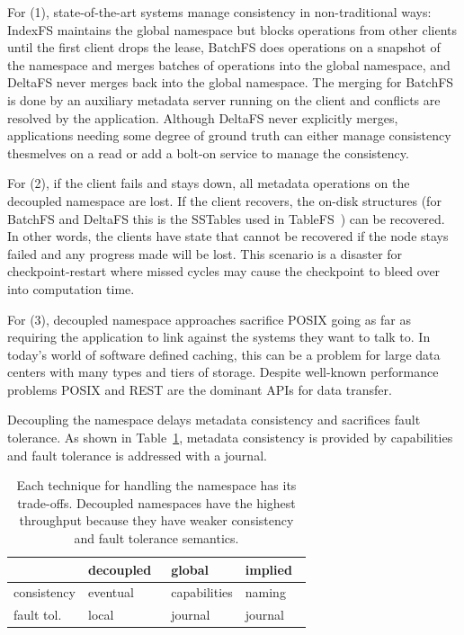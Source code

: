 \documentclass[preprint]{sigplanconf-eurosys}
\begin{document}
For (1), state-of-the-art systems manage consistency in non-traditional ways:
IndexFS maintains the global namespace but blocks operations from other clients
until the first client drops the lease, BatchFS does operations on a snapshot
of the namespace and merges batches of operations into the global namespace,
and DeltaFS never merges back into the global namespace. The merging for
BatchFS is done by an auxiliary metadata server running on the client and conflicts are
resolved by the application. Although DeltaFS never explicitly merges,
applications needing some degree of ground truth can either manage consistency
thesmelves on a read or add a bolt-on service to manage the consistency.

For (2), if the client fails and stays down, all metadata operations on the
decoupled namespace are lost. If the client recovers, the on-disk structures
(for BatchFS and DeltaFS this is the SSTables used in
TableFS~\cite{ren:atc2013-tablefs}) can be recovered. In other words, the
clients have state that cannot be recovered if the node stays failed and any
progress made will be lost. This scenario is a disaster for checkpoint-restart
where missed cycles may cause the checkpoint to bleed over into computation
time.

For (3), decoupled namespace approaches sacrifice POSIX going as far as
requiring the application to link against the systems they want to talk to. In
today's world of software defined caching, this can be a problem for large data
centers with many types and tiers of storage. Despite well-known  performance
problems POSIX and REST are the dominant APIs for data transfer.

Decoupling the namespace delays metadata consistency and sacrifices fault
tolerance. As shown in Table~\ref{table:namespaces}, metadata consistency is
provided by capabilities and fault tolerance is addressed with a journal.

\begin{table}[t!]
\centering
\begin{tabular}{l|l|l|l}
                  & decoupled~\cite{zheng:pdsw2014-batchfs, zheng:pdsw2015-deltafs}
                  & global~\cite{weil:sc2004-dyn-metadata, ren:sc2014-indexfs}
                  & implied~\cite{bent_plfs_2009} \\ \hline
  consistency     & eventual      & capabilities  & naming \\
  fault tol.      & local         & journal       & journal
\end{tabular}
\caption{Each technique for handling the namespace has its trade-offs.
Decoupled namespaces have the highest throughput because they have weaker
consistency and fault tolerance semantics.
\label{table:namespaces}}
\end{table}
\end{document}
